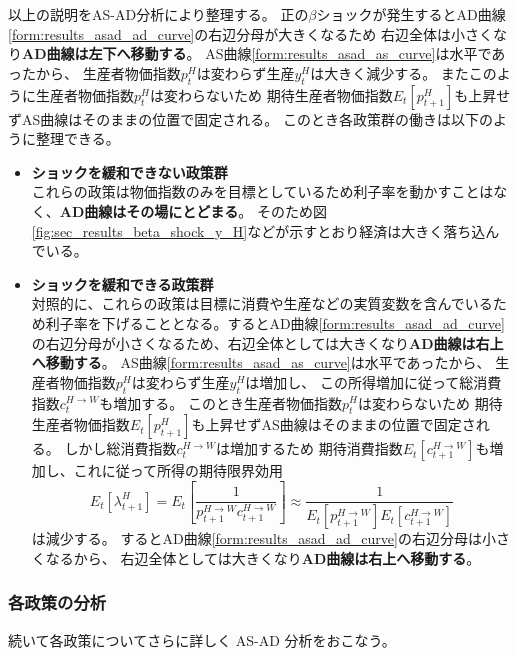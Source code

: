 以上の説明をAS-AD分析により整理する。
正の\(\beta\)ショックが発生するとAD曲線\eqref{form:results_asad_ad_curve}の右辺分母が大きくなるため
右辺全体は小さくなり\textbf{AD曲線は左下へ移動する}。
AS曲線\eqref{form:results_asad_as_curve}は水平であったから、
生産者物価指数\(p_t^H\)は変わらず生産\(y_t^H\)は大きく減少する。
またこのように生産者物価指数\(p_t^H\)は変わらないため
期待生産者物価指数\(E_t[p_{t+1}^H]\)も上昇せずAS曲線はそのままの位置で固定される。
このとき各政策群の働きは以下のように整理できる。
\begin{itemize}
    \item[①] \textbf{ショックを緩和できない政策群} \\
    これらの政策は物価指数のみを目標としているため利子率を動かすことはなく、\textbf{AD曲線はその場にとどまる}。
    そのため図\ref{fig:sec_results_beta_shock_y_H}などが示すとおり経済は大きく落ち込んでいる。
    \item[②] \textbf{ショックを緩和できる政策群} \\
    対照的に、これらの政策は目標に消費や生産などの実質変数を含んでいるため利子率を下げることとなる。するとAD曲線\eqref{form:results_asad_ad_curve}の右辺分母が小さくなるため、右辺全体としては大きくなり\textbf{AD曲線は右上へ移動する}。
    AS曲線\eqref{form:results_asad_as_curve}は水平であったから、
    生産者物価指数\(p_t^H\)は変わらず生産\(y_t^H\)は増加し、
    この所得増加に従って総消費指数\(c_t^{H\to W}\)も増加する。
    このとき生産者物価指数\(p_t^H\)は変わらないため
    期待生産者物価指数\(E_t[p_{t+1}^H]\)も上昇せずAS曲線はそのままの位置で固定される。
    しかし総消費指数\(c_t^{H\to W}\)は増加するため
    期待消費指数\(E_t[c_{t+1}^{H\to W}]\)も増加し、これに従って所得の期待限界効用
    \begin{equation}
        E_t[\lambda_{t+1}^H]=E_t\left[\frac{1}{p_{t+1}^{H\to W}c_{t+1}^{H\to W}}\right]\approx\frac{1}{E_t[p_{t+1}^{H\to W}]E_t[c_{t+1}^{H\to W}]}
    \end{equation}
    は減少する。
    するとAD曲線\eqref{form:results_asad_ad_curve}の右辺分母は小さくなるから、
    右辺全体としては大きくなり\textbf{AD曲線は右上へ移動する}。
\end{itemize}

\subsubsection{各政策の分析}
\label{sec:sec_results_beta_shock_analysis_detail}
続いて各政策についてさらに詳しく AS-AD 分析をおこなう。

